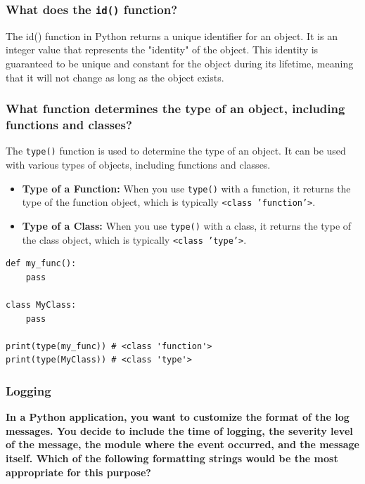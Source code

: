 \subsubsection{What does the \texttt{id()} function?}
The id() function in Python returns a unique identifier for an object. It is an integer value that represents the "identity" of the object. This identity is guaranteed to be unique and constant for the object during its lifetime, meaning that it will not change as long as the object exists.

\subsubsection{What function determines the type of an object, including functions and classes?}
The \texttt{type()} function is used to determine the type of an object. It can be used with various types of objects, including functions and classes.

\begin{itemize}
    \item \textbf{Type of a Function:} When you use \texttt{type()} with a function, it returns the type of the function object, which is typically \texttt{<class 'function'>}.
    
    \item \textbf{Type of a Class:} When you use \texttt{type()} with a class, it returns the type of the class object, which is typically \texttt{<class 'type'>}.
\end{itemize}

\begin{codebox}
\begin{verbatim}
def my_func():
    pass

class MyClass:
    pass

print(type(my_func)) # <class 'function'>
print(type(MyClass)) # <class 'type'>
\end{verbatim}
\end{codebox}

\subsubsection{Logging}
\textbf{In a Python application, you want to customize the format of the log messages. You decide to include the time of logging, the severity level of the message, the module where the event occurred, and the message itself. Which of the following formatting strings would be the most appropriate for this purpose?}\\

